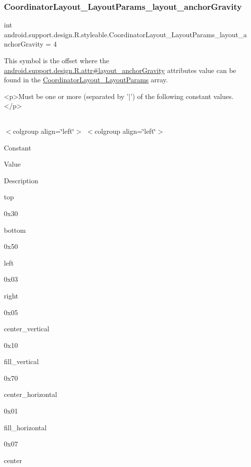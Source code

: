 \subsubsection{\texorpdfstring{Coordinator\+Layout\+\_\+\+Layout\+Params\+\_\+layout\+\_\+anchor\+Gravity}{CoordinatorLayout\_LayoutParams\_layout\_anchorGravity}}
{\footnotesize\ttfamily int android.\+support.\+design.\+R.\+styleable.\+Coordinator\+Layout\+\_\+\+Layout\+Params\+\_\+layout\+\_\+anchor\+Gravity = 4\hspace{0.3cm}{\ttfamily [static]}}

This symbol is the offset where the \hyperlink{classandroid_1_1support_1_1design_1_1R_1_1attr_a04fb1ebb304aea3c387eb9ad4978be39}{android.\+support.\+design.\+R.\+attr\#layout\+\_\+anchor\+Gravity} attribute\textquotesingle{}s value can be found in the \hyperlink{classandroid_1_1support_1_1design_1_1R_1_1styleable_a8dd236b417b377b73830c1c47c3b2490}{Coordinator\+Layout\+\_\+\+Layout\+Params} array.

\begin{DoxyVerb}      <p>Must be one or more (separated by '|') of the following constant values.</p>
\end{DoxyVerb}
 \tabulinesep=1mm
\begin{longtabu} spread 0pt [c]{*{0}{|X[-1]}|}
\hline
\end{longtabu}
$<$colgroup align=\char`\"{}left\char`\"{}$>$ $<$colgroup align=\char`\"{}left\char`\"{}$>$ 

Constant

Value

Description 

{\ttfamily top}

0x30

{\ttfamily bottom}

0x50

{\ttfamily left}

0x03

{\ttfamily right}

0x05

{\ttfamily center\+\_\+vertical}

0x10

{\ttfamily fill\+\_\+vertical}

0x70

{\ttfamily center\+\_\+horizontal}

0x01

{\ttfamily fill\+\_\+horizontal}

0x07

{\ttfamily center}

